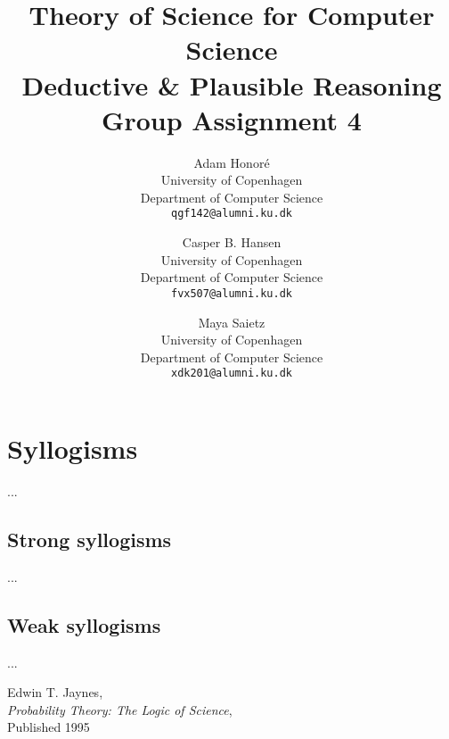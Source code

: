 \documentclass[11pt]{article}
\title
{
	{\large Theory of Science for Computer Science}\\
	Deductive \& Plausible Reasoning\\
	{\Large Group Assignment 4}
	\vspace{0.25in}
}
\author
{
	Adam Honoré\\
	University of Copenhagen\\
	Department of Computer Science\\
	{\tt qgf142@alumni.ku.dk}
	\and
	Casper B. Hansen\\
	University of Copenhagen\\
	Department of Computer Science\\
	{\tt fvx507@alumni.ku.dk}
	\and
	Maya Saietz\\
	University of Copenhagen\\
	Department of Computer Science\\
	{\tt xdk201@alumni.ku.dk}
}
\begin{document}
\clearpage
\maketitle
\thispagestyle{empty}

\section{Syllogisms}
...

\begin{multicols}{2}
	
	\subsection{Strong syllogisms}
	...
	\vfill
	
	\columnbreak
	
	\subsection{Weak syllogisms}
	...
	\vfill
	
\end{multicols}

\newpage
\begin{thebibliography}{9}
	
	Edwin T. Jaynes,\\
	\emph{Probability Theory: The Logic of Science},\\
	Published 1995

\end{thebibliography}
\end{document}
